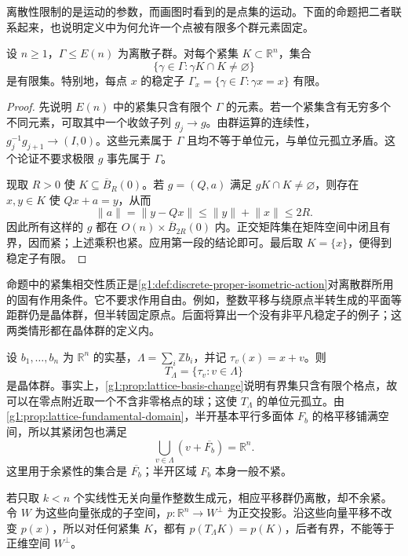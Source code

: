 离散性限制的是运动的参数，而画图时看到的是点集的运动。下面的命题把二者联系起来，也说明定义中为何允许一个点被有限多个群元素固定。

\begin{proposition}
	\label{g1:prop:euclidean-discrete-proper}
	设 \(n\ge1\)，\(\Gamma\le E(n)\) 为离散子群。对每个紧集 \(K\subset\mathbb R^n\)，集合
	\[
		\{\gamma\in\Gamma:\gamma K\cap K\ne\varnothing\}
	\]
	是有限集。特别地，每点 \(x\) 的稳定子 \(\Gamma_x=\{\gamma\in\Gamma:\gamma x=x\}\) 有限。
\end{proposition}
\begin{proof}
	先说明 \(E(n)\) 中的紧集只含有限个 \(\Gamma\) 的元素。若一个紧集含有无穷多个不同元素，可取其中一个收敛子列 \(g_j\to g\)。由群运算的连续性，\(g_j^{-1}g_{j+1}\to(I,0)\)。这些元素属于 \(\Gamma\) 且均不等于单位元，与单位元孤立矛盾。这个论证不要求极限 \(g\) 事先属于 \(\Gamma\)。

	现取 \(R>0\) 使 \(K\subseteq\overline B_R(0)\)。若 \(g=(Q,a)\) 满足 \(gK\cap K\ne\varnothing\)，则存在 \(x,y\in K\) 使 \(Qx+a=y\)，从而
	\[
		\lVert a\rVert=\lVert y-Qx\rVert\le\lVert y\rVert+\lVert x\rVert\le2R.
	\]
	因此所有这样的 \(g\) 都在 \(O(n)\times\overline B_{2R}(0)\) 内。正交矩阵集在矩阵空间中闭且有界，因而紧；上述乘积也紧。应用第一段的结论即可。最后取 \(K=\{x\}\)，便得到稳定子有限。
\end{proof}

命题中的紧集相交性质正是\cref{g1:def:discrete-proper-isometric-action}对离散群所用的固有作用条件。它不要求作用自由。例如，整数平移与绕原点半转生成的平面等距群仍是晶体群，但半转固定原点。后面将算出一个没有非平凡稳定子的例子；这两类情形都在晶体群的定义内。

\begin{example}
	\label{g1:exm:lattice-translation-group}
	设 \(b_1,\ldots,b_n\) 为 \(\mathbb R^n\) 的实基，\(\Lambda=\sum_i\mathbb Zb_i\)，并记 \(\tau_v(x)=x+v\)。则
	\[
		T_\Lambda=\{\tau_v:v\in\Lambda\}
	\]
	是晶体群。事实上，\cref{g1:prop:lattice-basis-change}说明有界集只含有限个格点，故可以在零点附近取一个不含非零格点的球；这使 \(T_\Lambda\) 的单位元孤立。由\cref{g1:prop:lattice-fundamental-domain}，半开基本平行多面体 \(F_b\) 的格平移铺满空间，所以其紧闭包也满足
	\[
		\bigcup_{v\in\Lambda}(v+\overline{F_b})=\mathbb R^n.
	\]
	这里用于余紧性的集合是 \(\overline{F_b}\)；半开区域 \(F_b\) 本身一般不紧。

	若只取 \(k<n\) 个实线性无关向量作整数生成元，相应平移群仍离散，却不余紧。令 \(W\) 为这些向量张成的子空间，\(p:\mathbb R^n\to W^\perp\) 为正交投影。沿这些向量平移不改变 \(p(x)\)，所以对任何紧集 \(K\)，都有 \(p(T_\Lambda K)=p(K)\)，后者有界，不能等于正维空间 \(W^\perp\)。
\end{example}

